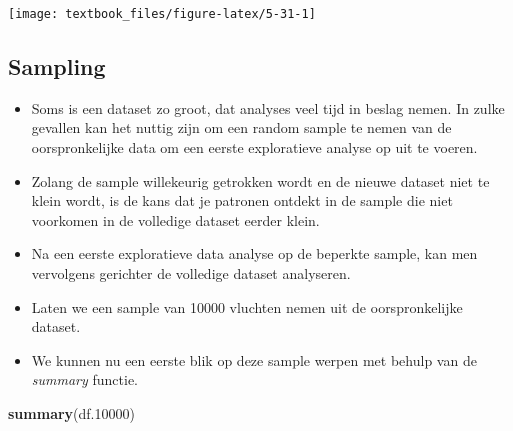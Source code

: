 \documentclass[]{tufte-book}
\newenvironment{Shaded}{}{}
\newcommand{\DecValTok}[1]{\textcolor[rgb]{0.25,0.63,0.44}{#1}}
\newcommand{\FloatTok}[1]{\textcolor[rgb]{0.25,0.63,0.44}{#1}}
\newcommand{\KeywordTok}[1]{\textcolor[rgb]{0.00,0.44,0.13}{\textbf{#1}}}
\newcommand{\NormalTok}[1]{#1}
\newcommand{\OperatorTok}[1]{\textcolor[rgb]{0.40,0.40,0.40}{#1}}
\newcommand{\StringTok}[1]{\textcolor[rgb]{0.25,0.44,0.63}{#1}}
\providecommand{\tightlist}{%
  \setlength{\itemsep}{0pt}\setlength{\parskip}{0pt}}
\begin{document}
\texttt{[image: textbook\_files/figure-latex/5-31-1]}

\hypertarget{sampling}{%
\subsection{Sampling}\label{sampling}}

\begin{itemize}
\tightlist
\item
  Soms is een dataset zo groot, dat analyses veel tijd in beslag nemen. In zulke gevallen kan het nuttig zijn om een random sample te nemen van de oorspronkelijke data om een eerste exploratieve analyse op uit te voeren.
\item
  Zolang de sample willekeurig getrokken wordt en de nieuwe dataset niet te klein wordt, is de kans dat je patronen ontdekt in de sample die niet voorkomen in de volledige dataset eerder klein.
\item
  Na een eerste exploratieve data analyse op de beperkte sample, kan men vervolgens gerichter de volledige dataset analyseren.
\item
  Laten we een sample van 10000 vluchten nemen uit de oorspronkelijke dataset.
\end{itemize}

\begin{Shaded}
\end{Shaded}

\begin{itemize}
\tightlist
\item
  We kunnen nu een eerste blik op deze sample werpen met behulp van de \emph{summary} functie.
\end{itemize}

\begin{Shaded}
\begin{Highlighting}[]
\KeywordTok{summary}\NormalTok{(df}\FloatTok{.10000}\NormalTok{)}
\end{Highlighting}
\end{Shaded}
\end{document}
